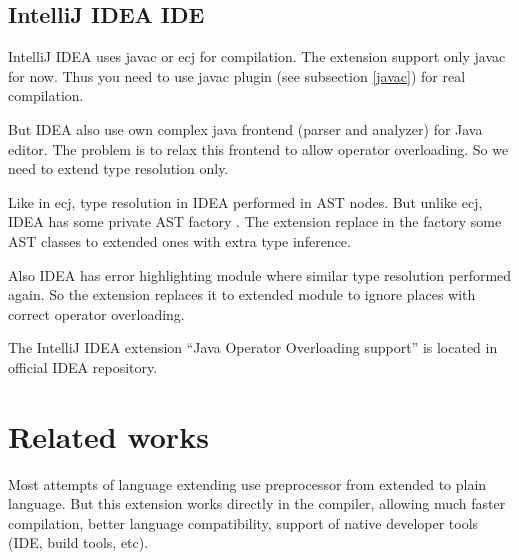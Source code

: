 \documentclass{aircc}
\begin{document}
\subsection{IntelliJ IDEA IDE \label{idea}}

IntelliJ IDEA uses javac or ecj for compilation. The extension support only javac for now.
Thus you need to use javac plugin (see subsection \ref{javac}) for real compilation.

But IDEA also use own complex java frontend (parser and analyzer) for Java editor.
The problem is to relax this frontend to allow operator overloading. So we need to extend type resolution only.

Like in ecj, type resolution in IDEA performed in AST nodes. 
But unlike ecj, IDEA has some private AST factory .
The extension replace in the factory some AST classes to extended ones with extra type inference.

Also IDEA has error highlighting module  where similar type resolution performed again.
So the extension replaces it to extended module to ignore places with correct operator overloading.

The IntelliJ IDEA extension ``Java Operator Overloading support'' is located in official IDEA repository.





\section{Related works}

Most attempts of language extending use preprocessor from extended to plain language.
But this extension works directly in the compiler, 
allowing much faster compilation, better language compatibility,
support of native developer tools (IDE, build tools, etc).
\end{document}
